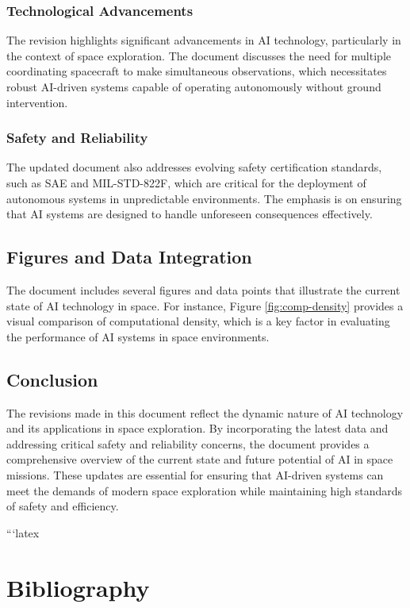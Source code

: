\documentclass[a4paper, 11pt]{article}
\begin{document}
\subsubsection{Technological Advancements}

The revision highlights significant advancements in AI technology, particularly in the context of space exploration. The document discusses the need for multiple coordinating spacecraft to make simultaneous observations, which necessitates robust AI-driven systems capable of operating autonomously without ground intervention.

\subsubsection{Safety and Reliability}

The updated document also addresses evolving safety certification standards, such as SAE and MIL-STD-822F, which are critical for the deployment of autonomous systems in unpredictable environments. The emphasis is on ensuring that AI systems are designed to handle unforeseen consequences effectively.

\subsection{Figures and Data Integration}

The document includes several figures and data points that illustrate the current state of AI technology in space. For instance, Figure \ref{fig:comp-density} provides a visual comparison of computational density, which is a key factor in evaluating the performance of AI systems in space environments.

\subsection{Conclusion}

The revisions made in this document reflect the dynamic nature of AI technology and its applications in space exploration. By incorporating the latest data and addressing critical safety and reliability concerns, the document provides a comprehensive overview of the current state and future potential of AI in space missions. These updates are essential for ensuring that AI-driven systems can meet the demands of modern space exploration while maintaining high standards of safety and efficiency.

```latex
\section{Bibliography}
\end{document}
